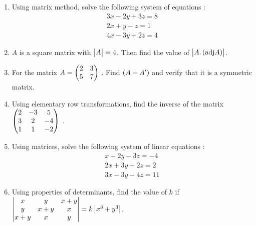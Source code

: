\begin{enumerate}
\item Using matrix method, solve the following system of equations :
\begin{align*}
    {3x-2y+3z}=8 \\
    {2x+y-z}=1 \\
    {4x-3y+2z}=4
\end{align*}

\item $ A $ is a square matrix with $\begin{vmatrix}A\end{vmatrix} = 4 $. Then find the value of  $\begin{vmatrix} A .\left(\text{adj} A\right)\end{vmatrix}$.

\item For the matrix $A = \begin{pmatrix}2 & 3  \\ 5 & 7\end{pmatrix} $ . Find $\left(A + A'\right)$ and verify that it is a symmetric matrix.

\item Using elementary row transformations, find the inverse of the matrix
$\begin{pmatrix}2 & -3 &5 \\ 3 & 2 & -4 \\ 1 & 1 & -2\end{pmatrix}$ .


\item Using matrices, solve the following system of linear equations :
\begin{align*}
 x+2y-3z=-4\\
 2x+3y+2z=2\\
 3x-3y-4z=11
\end{align*}


\item Using properties of determinants, find the value of $k $ if
$\begin{vmatrix}x & y & x+y \\ y & x+y & x \\ x+y & x & y\end{vmatrix} =k\begin{vmatrix}x^{3}+y^{3}\end{vmatrix}$.
\end{enumerate}
